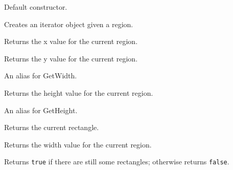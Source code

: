
\label{wxregioniteratorctor}


Default constructor.


Creates an iterator object given a region.

\label{wxregioniteratorgetx}


Returns the x value for the current region.

\label{wxregioniteratorgety}


Returns the y value for the current region.

\label{wxregioniteratorgetw}


An alias for GetWidth.

\label{wxregioniteratorgetheight}


Returns the height value for the current region.

\label{wxregioniteratorgeth}


An alias for GetHeight.

\label{wxregioniteratorgetrect}


Returns the current rectangle.

\label{wxregioniteratorgetwidth}


Returns the width value for the current region.

\label{wxregioniteratorhaverects}


Returns {\tt true} if there are still some rectangles; otherwise returns {\tt false}.

